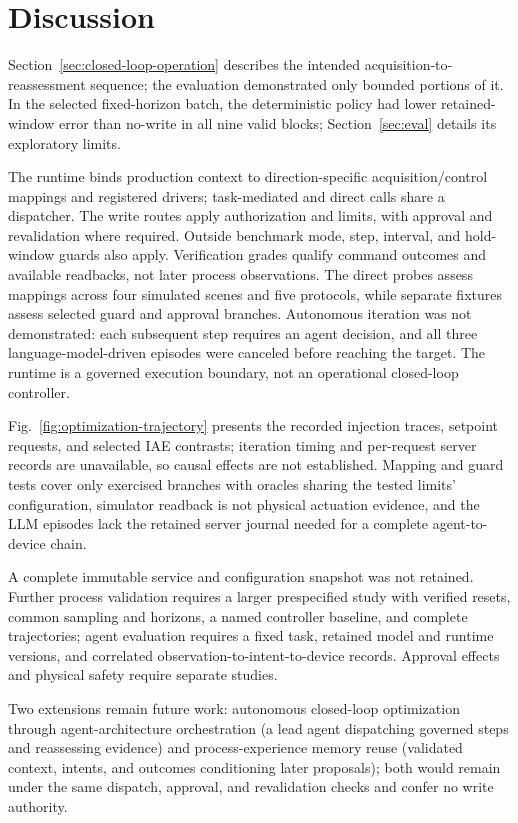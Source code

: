 \section{Discussion}
\label{sec:discussion}
Section~\ref{sec:closed-loop-operation} describes the intended acquisition-to-reassessment sequence; the evaluation demonstrated only bounded portions of it. In the selected fixed-horizon batch, the deterministic policy had lower retained-window error than no-write in all nine valid blocks; Section~\ref{sec:eval} details its exploratory limits.

The runtime binds production context to direction-specific acquisition/control mappings and registered drivers; task-mediated and direct calls share a dispatcher. The write routes apply authorization and limits, with approval and revalidation where required. Outside benchmark mode, step, interval, and hold-window guards also apply. Verification grades qualify command outcomes and available readbacks, not later process observations. The direct probes assess mappings across four simulated scenes and five protocols, while separate fixtures assess selected guard and approval branches. Autonomous iteration was not demonstrated: each subsequent step requires an agent decision, and all three language-model-driven episodes were canceled before reaching the target. The runtime is a governed execution boundary, not an operational closed-loop controller.

Fig.~\ref{fig:optimization-trajectory} presents the recorded injection traces, setpoint requests, and selected IAE contrasts; iteration timing and per-request server records are unavailable, so causal effects are not established. Mapping and guard tests cover only exercised branches with oracles sharing the tested limits' configuration, simulator readback is not physical actuation evidence, and the LLM episodes lack the retained server journal needed for a complete agent-to-device chain.

A complete immutable service and configuration snapshot was not retained. Further process validation requires a larger prespecified study with verified resets, common sampling and horizons, a named controller baseline, and complete trajectories; agent evaluation requires a fixed task, retained model and runtime versions, and correlated observation-to-intent-to-device records. Approval effects and physical safety require separate studies.

Two extensions remain future work: autonomous closed-loop optimization through agent-architecture orchestration (a lead agent dispatching governed steps and reassessing evidence) and process-experience memory reuse (validated context, intents, and outcomes conditioning later proposals); both would remain under the same dispatch, approval, and revalidation checks and confer no write authority.

